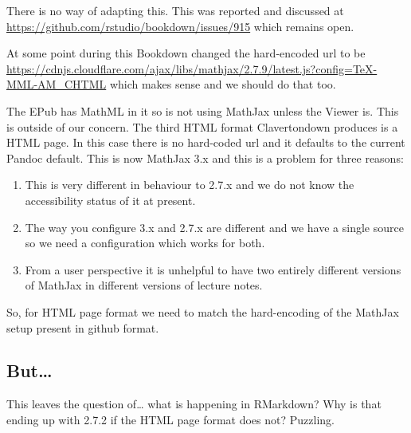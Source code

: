 \documentclass[
  10pt,
  a4paper]{article}
\providecommand{\tightlist}{%
  \setlength{\itemsep}{0pt}\setlength{\parskip}{0pt}}
\begin{document}
There is no way of adapting this. This was reported and discussed at \url{https://github.com/rstudio/bookdown/issues/915} which remains open.

At some point during this Bookdown changed the hard-encoded url to be \url{https://cdnjs.cloudflare.com/ajax/libs/mathjax/2.7.9/latest.js?config=TeX-MML-AM_CHTML} which makes sense and we should do that too.

The EPub has MathML in it so is not using MathJax unless the Viewer is. This is outside of our concern. The third HTML format Clavertondown produces is a HTML page. In this case there is no hard-coded url and it defaults to the current Pandoc default. This is now MathJax 3.x and this is a problem for three reasons:

\begin{enumerate}
\def\labelenumi{\arabic{enumi}.}
\tightlist
\item
  This is very different in behaviour to 2.7.x and we do not know the accessibility status of it at present.
\item
  The way you configure 3.x and 2.7.x are different and we have a single source so we need a configuration which works for both.
\item
  From a user perspective it is unhelpful to have two entirely different versions of MathJax in different versions of lecture notes.
\end{enumerate}

So, for HTML page format we need to match the hard-encoding of the MathJax setup present in github format.

\hypertarget{but}{%
\subsection{But\ldots{}}\label{but}}

This leaves the question of\ldots{} what is happening in RMarkdown? Why is that ending up with 2.7.2 if the HTML page format does not? Puzzling.
\end{document}
